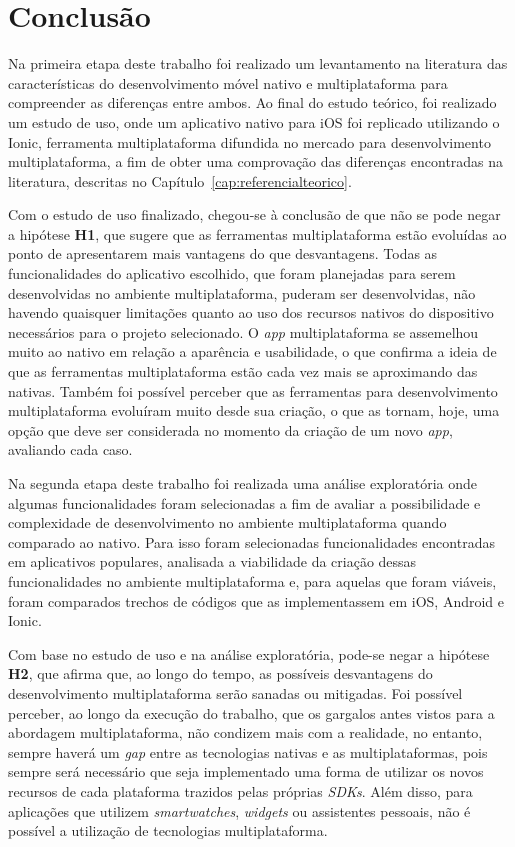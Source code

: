 \chapter{Conclusão} \label{cap:consideracoespreliminares}
Na primeira etapa deste trabalho foi realizado um levantamento na literatura das características do desenvolvimento móvel nativo e multiplataforma para compreender as diferenças entre ambos. Ao final do estudo teórico, foi 
realizado um estudo de uso, onde um aplicativo nativo para iOS foi replicado utilizando o Ionic, ferramenta multiplataforma difundida 
no mercado para desenvolvimento multiplataforma, a fim de obter uma comprovação das diferenças encontradas na literatura, descritas no Capítulo~\ref{cap:referencialteorico}.

Com o estudo de uso finalizado, chegou-se à conclusão de que não se pode negar a hipótese \textbf{H1}, que sugere que as ferramentas multiplataforma estão evoluídas ao ponto de apresentarem mais vantagens do que desvantagens.
Todas as funcionalidades do aplicativo escolhido, que foram planejadas para serem desenvolvidas no ambiente multiplataforma, puderam ser desenvolvidas, não havendo quaisquer limitações quanto ao uso dos 
recursos nativos do dispositivo necessários para o projeto selecionado. O \textit{app} multiplataforma se assemelhou muito ao nativo em relação a aparência e usabilidade, o que confirma a ideia de que as ferramentas 
multiplataforma estão cada vez mais se aproximando das nativas. Também foi possível perceber que as ferramentas para desenvolvimento multiplataforma evoluíram muito desde sua criação, o que as tornam, hoje, uma 
opção que deve ser considerada no momento da criação de um novo \textit{app}, avaliando cada caso.

Na segunda etapa deste trabalho foi realizada uma análise exploratória onde algumas funcionalidades foram selecionadas a fim de avaliar a possibilidade e complexidade de desenvolvimento no ambiente 
multiplataforma quando comparado ao nativo. Para isso foram selecionadas funcionalidades encontradas em aplicativos populares, analisada a viabilidade da criação dessas funcionalidades no ambiente multiplataforma e, 
para aquelas que foram viáveis, foram comparados trechos de códigos que as implementassem em iOS, Android e Ionic. 

Com base no estudo de uso e na análise exploratória, pode-se negar a hipótese \textbf{H2}, que afirma que, ao longo do tempo, as possíveis desvantagens do desenvolvimento multiplataforma serão sanadas ou mitigadas. 
Foi possível perceber, ao longo da execução do trabalho, que os gargalos antes vistos para a abordagem multiplataforma, não condizem mais com a realidade, no entanto, sempre haverá um \textit{gap} entre as tecnologias 
nativas e as multiplataformas, pois sempre será necessário que seja implementado uma forma de utilizar os novos recursos de cada plataforma trazidos pelas próprias \textit{SDKs}. Além disso, para aplicações que utilizem 
\textit{smartwatches}, \textit{widgets} ou assistentes pessoais, não é possível a utilização de tecnologias multiplataforma.


